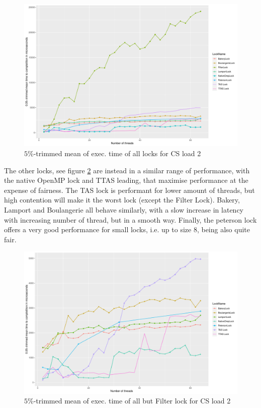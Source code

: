 \begin{figure}[H]
  \includegraphics[width=\textwidth]{fig/meantime_2_all}
  \caption{$5\%$-trimmed mean of exec. time of all locks for CS load 2}
  \label{fig:meantime-2-all}
\end{figure}

The other locks, see figure \ref{fig:meantime-2-no-filter} are instead in a similar
range of performance, with the native OpenMP lock and TTAS leading, that maximise
performance at the expense of fairness.
The TAS lock is performant for lower amount of threads, but high contention will
make it the worst lock (except the Filter Lock).
Bakery, Lamport and Boulangerie all behave similarly, with a slow increase in
latency with increasing number of thread, but in a smooth way.
Finally, the peterson lock offers a very good performance for small locks, i.e.
up to size 8, being also quite fair.
\begin{figure}[H]
  \includegraphics[width=\textwidth]{fig/meantime_2_no_filter}
  \caption{$5\%$-trimmed mean of exec. time of all but Filter lock for CS load 2}
  \label{fig:meantime-2-no-filter}
\end{figure}

